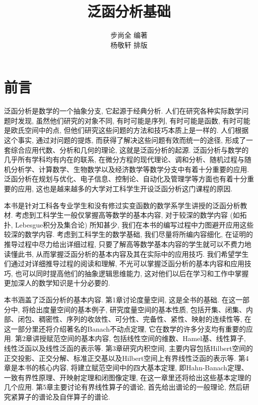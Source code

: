 \documentclass[openany]{ctexbook}
\theoremstyle{kaiti}
\theoremstyle{normal}
\begin{document}
\title{\heiti \Huge 泛函分析基础 \vspace{0.5cm}}
\author{\LARGE\kaishu 步尚全 \quad 编著 \vspace{0.5cm} \\  \LARGE\kaishu 杨敬轩 \quad 排版 \vspace{1cm}}

\maketitle
\thispagestyle{empty}

\frontmatter
{}
\chapter*{前言}

泛函分析是数学的一个抽象分支, 它起源于经典分析. 人们在研究各种实际数学问题时发现, 虽然他们研究的对象不同, 有时可能是序列, 有时可能是函数, 有时可能是欧氏空间中的点, 但他们研究这些问题的方法和技巧本质上是一样的. 人们根据这个事实, 通过对问题的提炼, 而获得了解决这些问题有效而统一的途径, 形成了一套综合应用代数、分析和几何的理论, 这就是泛函分析的起源. 泛函分析与数学的几乎所有学科均有内在的联系, 在微分方程的现代理论、调和分析、随机过程与随机分析学、计算数学、生物数学以及经济数学等数学分支中有着十分重要的应用. 泛函分析在规划与优化、电子信息、控制论、自动化及管理学等方面也有着十分重要的应用, 这也是越来越多的大学对工科学生开设泛函分析这门课程的原因.

本书是针对工科各专业学生和没有修过实变函数的数学系学生讲授的泛函分析教材. 考虑到工科学生一般仅掌握高等数学的基本内容, 对于较深的数学内容 (如拓扑, Lebesgue积分及集合论) 所知甚少, 我们在本书的编写过程中力图避开应用这些较深的数学内容. 考虑到工科学生的数学基础, 我们尽量将所编内容细化, 在证明的推导过程中尽力给出详细过程, 只要了解高等数学基本内容的学生就可以不费力地读懂此书, 从而掌握泛函分析的基本内容及其在实际中的应用技巧. 我们希望学生们通过对详细推导过程的阅读和理解, 不光可以掌握泛函分析的基本内容和应用技巧, 也可以同时提高他们的抽象逻辑思维能力, 这对他们以后在学习和工作中掌握更加深人的数学知识是十分必要的.

本书涵盖了泛函分析的基本内容. 第1章讨论度量空间, 这是全书的基础. 在这一部分中, 将给出度量空间的基本例子, 研究度量空间的基本性质, 包括开集、闭集、内部、闭包、稠密性、序列的收敛性、可分性、完备性、紧性、映射的连续性等, 在这一部分里还将介绍著名的Banach不动点定理, 它在数学的许多分支均有重要的应用. 第2章讲授赋范空间的基本内容, 包括线性空间的维数、Hamel基、线性算子, 线性泛函以及线性泛函的表示等. 第3章研究内积空间, 主要内容包括Hilbert空间的正交投影、正交分解、标准正交基以及Hilbert空间上有界线性泛函的表示等. 第4章是本书的核心内容, 将建立赋范空间中的四大基本定理, 即Hahn-Banach定理、一致有界性原理、开映射定理和闭图像定理, 在这一章里还将给出这些基本定理的几个应用. 第5章主要讨论有界线性算子的谱论, 首先给出谱论的一般理论, 然后研究紧算子的谱论及自伴算子的谱论.
\end{document}
